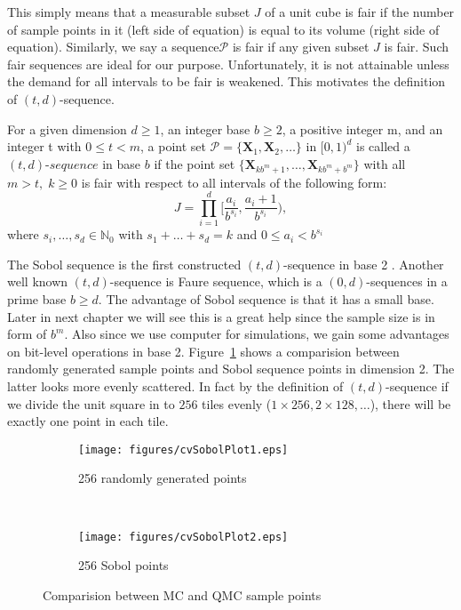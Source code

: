 This simply means that a measurable subset $J$ of a unit cube is fair if the number of sample points in it (left side of equation) is equal to its volume (right side of equation). 
Similarly, we say a sequence$\mathscr{P}$ is fair if any given subset $J$ is fair.  
Such fair sequences are ideal for our purpose. Unfortunately, it is not attainable unless the demand for all intervals to be fair is weakened. This motivates the definition of $(t,d)$-sequence. 
\theoremstyle{definition}
\begin{definition}{}
    For a given dimension $d \geq 1$, an integer base $b \geq 2$, a positive integer m, and an integer t with $0 \leq t < m$, a point set $\mathscr{P} =\{\mathbf{X}_1,\mathbf{X}_2,\dots\}$ in $[0, 1)^d$ is called a $\textit{$(t,d)$-sequence}$ in base $b$ 
if the point set $\{\mathbf{X}_{kb^m+1},\dots,\mathbf{X}_{kb^m+b^m}\}$ with all $m>t,\;k\geq 0$ is fair with respect to all intervals of the following form:
    \[
        J=\prod_{i=1}^{d}\Big[\frac{a_i}{b^{s_i}}, \frac{a_i+1}{b^{s_i}}\Big),
                    \]
                    where $s_i,\dots, s_d\in\mathbb{N}_0$ with $s_1+\dots+s_d=k$ and $0\leq a_i < b^{s_i}$  
\end{definition}

The Sobol sequence is the first constructed $(t,d)$-sequence in base 2 \cite{dick2010digital}. Another well known $(t,d)$-sequence is Faure sequence, which is a $(0, d)$-sequences in a prime base $b \geq d$. 
The advantage of Sobol sequence is that it has a small base. 
Later in next chapter we will see this is a great help since the sample size is in form of $b^m$. 
Also since we use computer for simulations, we gain some advantages on bit-level operations in base 2.
Figure~\ref{fg:sobol} shows a comparision between randomly generated sample points and Sobol sequence points in dimension 2. 
The latter looks more evenly scattered. 
In fact by the definition of $(t,d)$-sequence if we divide the unit square in to $256$ tiles evenly ($1\times256, 2\times128,\dots$), there will be exactly one point in each tile.  

\begin{figure}
    \centering
    \begin{subfigure}[b]{.5\textwidth}
    \texttt{[image: figures/cvSobolPlot1.eps]}
    \caption{256 randomly generated points}
    \end{subfigure}~\begin{subfigure}[b]{.5\textwidth}
    \texttt{[image: figures/cvSobolPlot2.eps]}
    \caption{256 Sobol points}
    \end{subfigure}
    \caption{Comparision between MC and QMC sample points}\label{fg:sobol}
\end{figure}

